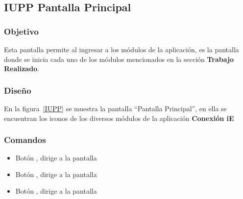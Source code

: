 \subsection{IUPP  Pantalla Principal}

\subsubsection{Objetivo}

	
    Esta pantalla permite al  ingresar a los módulos de la aplicación, es la pantalla donde se inicia cada uno de los módulos mencionados en la sección \textbf{Trabajo Realizado}.
\subsubsection{Diseño}


    En la figura~\ref{IUPP} se muestra la pantalla ``Pantalla Principal'', en ella se encuentran los iconos de los diversos módulos de la aplicación \textbf{Conexión iE}



\subsubsection{Comandos}
    \begin{itemize}

	\item Botón \botSalones, dirige a la pantalla 
	\item Botón \botProfesores, dirige a la pantalla 
	\item Botón \botUnidades, dirige a la pantalla 
    \end{itemize}
